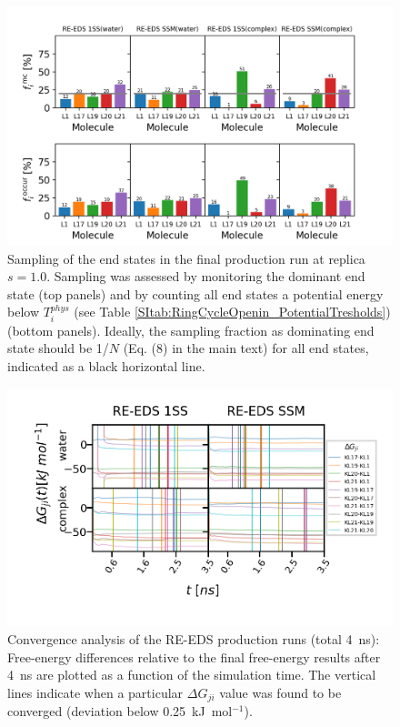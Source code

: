 \begin{figure}[h]
\centering
\includegraphics[width=\linewidth]{fig/results/ringOpening/FE/Reeds_RingOpening_production_sampling_s1.png}
\caption{Sampling of the end states in the final production run at replica $s=1.0$. Sampling was assessed by monitoring the dominant end state (top panels) and by counting all end states a potential energy below $T_{i}^{phys}$ (see Table \ref{SItab:RingCycleOpenin_PotentialTresholds}) (bottom panels). Ideally, the sampling fraction as dominating end state should be 1/$N$ (Eq. (8) in the main text) for all end states, indicated as a black horizontal line.}
\label{SIfig:CHK1_RingOpening_soptimization_final_Sampling_s1}
\end{figure}

\begin{figure}[h]
\centering
\includegraphics[width=\linewidth]{fig/results/ringOpening/FE/dF_RingOpening_Convergence.png}
\caption{Convergence analysis of the RE-EDS production runs (total 4~ns): Free-energy differences relative to the final free-energy results after 4~ns are plotted as a function of the simulation time. The vertical lines indicate when a particular $\Delta G_{ji}$ value was found to be converged (deviation below 0.25~kJ~mol$^{-1}$).}
\label{SIfig:CHK1_RingOpening_dF_convergence}
\end{figure}

%

 